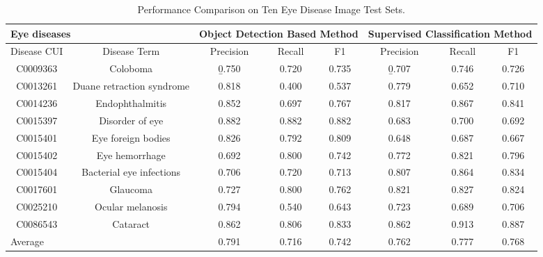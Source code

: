\setlength{\tabcolsep}{5.7pt}
\begin{table}
\centering
\caption{Performance Comparison on Ten Eye Disease Image Test Sets.}\label{eyeres}
\renewcommand{\arraystretch}{1.3}
\begin{tabular}{cccccccc}
\hline
\multicolumn{2}{l}{Eye diseases} & \multicolumn{3}{l}{Object Detection Based Method} &
\multicolumn{3}{l}{Supervised Classification Method} \\ \hline
Disease CUI    &Disease Term & Precision & Recall & F1    & Precision & Recall & F1 \\ \hline
C0009363       & Coloboma    &{\b 0.750} &0.720   &0.735  & {\b 0.707}&0.746   &0.726 \\ \hline
C0013261&Duane retraction syndrome& 0.818& 0.400  &0.537  &0.779      &0.652   &0.710 \\ \hline
C0014236&Endophthalmitis     &0.852      & 0.697  &0.767  &0.817      &0.867   &0.841 \\ \hline
C0015397 &Disorder of eye    &0.882      &0.882   &0.882  &0.683      &0.700   &0.692 \\ \hline
C0015401 &Eye foreign bodies &0.826      &0.792   &0.809  &0.648      &0.687   &0.667 \\ \hline
C0015402 &Eye hemorrhage	 &0.692      &0.800   &0.742  &0.772      &0.821   &0.796\\ \hline
C0015404 &Bacterial eye infections	&0.706    &0.720  &0.713      &0.807   &0.864   &0.834\\ \hline
C0017601 &Glaucoma           &0.727 &0.800 &0.762 &0.821 &0.827 &0.824\\ \hline
C0025210 &Ocular melanosis &0.794 &0.540 &0.643 &0.723 &0.689 &0.706 \\ \hline
C0086543 &Cataract &0.862  &0.806 &0.833 &0.862 &0.913 &0.887\\ \hline
\multicolumn{2}{l}{Average}&0.791 &0.716 &0.742 &0.762 &0.777 &0.768 \\ \hline
\end{tabular}
\end{table}

